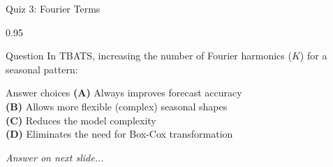 \documentclass[9pt, aspectratio=169, t]{beamer}
\begin{document}
\begin{frame}{Quiz 3: Fourier Terms}
    \begin{cminipage}{0.95\textwidth}
    \begin{alertblock}{Question}
        In TBATS, increasing the number of Fourier harmonics ($K$) for a seasonal pattern:
    \end{alertblock}

    \vspace{0.4cm}

    \begin{block}{Answer choices}
        \textcolor{MainBlue}{\textbf{(A)}} Always improves forecast accuracy\\[3pt]
        \textcolor{MainBlue}{\textbf{(B)}} Allows more flexible (complex) seasonal shapes\\[3pt]
        \textcolor{MainBlue}{\textbf{(C)}} Reduces the model complexity\\[3pt]
        \textcolor{MainBlue}{\textbf{(D)}} Eliminates the need for Box-Cox transformation
    \end{block}

    \vspace{0.5cm}

    \begin{center}
        \textit{Answer on next slide...}
    \end{center}
    \end{cminipage}
\end{frame}
\end{document}
